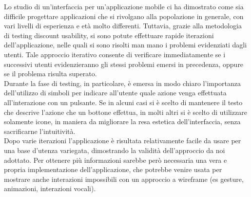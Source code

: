 Lo studio di un'interfaccia per un'applicazione mobile ci ha dimostrato come sia difficile
progettare applicazioni che si rivolgano alla popolazione in generale, con vari livelli di esperienza
e età molto differenti. Tuttavia, grazie alla metodologia di testing discount usability, si sono potute
effettuare rapide iterazioni dell'applicazione, nelle quali si sono risolti man mano i problemi evidenziati
dagli utenti. Tale approccio iterativo consente di verificare immediatamente se i successivi utenti evidenzieranno
gli stessi problemi emersi in precedenza, oppure se il problema risulta superato.
\\
Durante la fase di testing, in particolare, è emersa in modo chiaro l'importanza dell'utilizzo di simboli per
indicare all'utente quale azione venga effettuata all'interazione con un pulsante. Se in alcuni casi si è scelto di mantenere
il testo che descrive l'azione che un bottone effettua, in molti altri si è scelto di utilizzare solamente icone, in maniera
da migliorare la resa estetica dell'interfaccia, senza sacrificarne l'intuitività.
\\
Dopo varie iterazioni l'applicazione è risultata relativamente facile da usare per una base d'utenza variegata, dimostrando
la validità dell'approccio da noi adottato. Per ottenere più informazioni sarebbe però necessaria una vera e propria implementazione
dell'applicazione, che potrebbe venire usata per mostrare anche interazioni impossibili con un approccio a wireframe (es gesture, animazioni,
interazioni vocali).